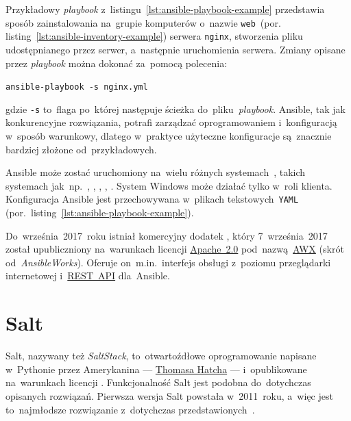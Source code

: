\documentclass[thesis]{subfiles}
\begin{document}
Przykładowy \emph{playbook} z~listingu~\ref{lst:ansible-playbook-example} przedstawia sposób zainstalowania na~grupie komputerów o~nazwie \texttt{web}~(por. listing~\ref{lst:ansible-inventory-example}) serwera \texttt{nginx}, stworzenia pliku udostępnianego przez serwer, a~następnie uruchomienia  serwera. Zmiany opisane przez \emph{playbook} można dokonać za~pomocą polecenia:\mynobreakpar
\begin{center}
\texttt{ansible-playbook -s nginx.yml}
\end{center}
gdzie \texttt{-s} to~flaga po~której następuje ścieżka do~pliku~\emph{playbook}. Ansible, tak jak konkurencyjne rozwiązania, potrafi zarządzać oprogramowaniem i~konfiguracją w~sposób warunkowy, dlatego w~praktyce użyteczne konfiguracje są~znacznie bardziej złożone od~przykładowych.

Ansible może zostać uruchomiony na~wielu różnych systemach~, takich systemach jak~np.~, \emph{\debian{}}, , , . System Windows może działać tylko w~roli klienta. Konfiguracja Ansible jest przechowywana w~plikach tekstowych~\texttt{YAML} (por.~listing~\ref{lst:ansible-playbook-example}).

Do~września~2017~roku istniał komercyjny dodatek , który 7~września~2017 został upubliczniony na~warunkach licencji \href{https://github.com/ansible/awx/blob/devel/LICENSE.md}{Apache~2.0} pod~nazwą~\href{https://github.com/ansible/awx}{AWX} (skrót od~\emph{AnsibleWorks}). Oferuje on~m.in.~interfejs obsługi z~poziomu przeglądarki internetowej i~\href{https://en.wikipedia.org/wiki/Representational_state_transfer}{REST~API} dla~Ansible.


\section{Salt}
\label{sec:salt}

Salt, nazywany też \emph{SaltStack}, to~otwartoźdłowe oprogramowanie napisane w~Pythonie przez Amerykanina --- \href{https://www.linkedin.com/in/thhatch/}{Thomasa Hatcha} --- i~opublikowane na~warunkach licencji . Funkcjonalność Salt jest podobna do~dotychczas opisanych rozwiązań. Pierwsza wersja Salt powstała w~2011~roku, a~więc jest to~najmłodsze rozwiązanie z~dotychczas przedstawionych~\cite{saltstack}.
\end{document}
